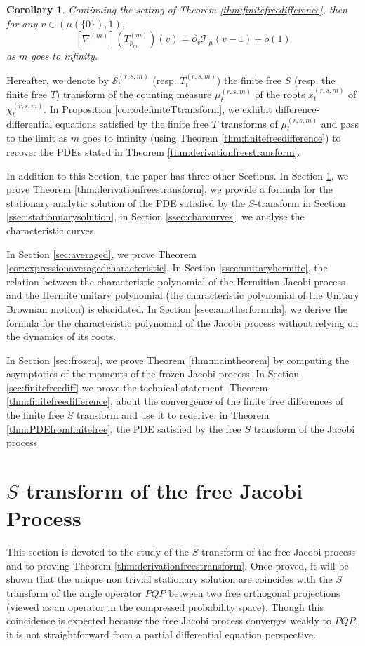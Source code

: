\documentclass[12pt,reqno]{amsart}
\newtheorem{corollary}{Corollary}
\begin{document}
\begin{corollary}
Continuing the setting of Theorem \ref{thm:finitefreedifference}, then for any $v \in (\mu{(\{ 0 \})},1)$, 
$$
[\nabla^{(m)}](T^{(m)}_{p_m})(v) = \partial_v \mathcal{T}_\mu(v-1) + o(1)
$$
as $m$ goes to infinity.
\end{corollary}
Hereafter, we denote by $\mathcal{S}^{(r,s,m)}_t$ (resp. $T^{(r,s,m)}_t$) the finite free $S$ (resp. the finite free $T$) transform of the counting measure $\mu^{(r,s,m)}_t$ of the roots 
$x^{(r,s,m)}_t$ of $\chi^{(r,s,m)}_t$. 
In Proposition \ref{cor:odefiniteTtransform}, we exhibit difference-differential equations satisfied by the finite free $T$ transforms of $\mu^{(r,s,m)}_t$ and pass to the limit as $m$ goes to infinity (using Theorem \ref{thm:finitefreedifference}) to recover the PDEs stated in Theorem \ref{thm:derivationfreestransform}.

In addition to this Section, the paper has three other Sections. In Section \ref{sec:stransformfree}, we prove Theorem \ref{thm:derivationfreestransform}, we provide a formula for the stationary analytic solution of the PDE satisfied by the $S$-transform in Section \ref{ssec:stationnarysolution},  in Section \ref{ssec:charcurves}, we analyse the characteristic curves. 

In Section \ref{sec:averaged}, we prove Theorem \ref{cor:expressionaveragedcharacteristic}. In Section \ref{ssec:unitaryhermite}, the relation between the characteristic polynomial of the Hermitian Jacobi process and the Hermite unitary polynomial (the characteristic polynomial of the Unitary Brownian motion) is elucidated. In Section \ref{ssec:anotherformula}, we derive the formula for the characteristic polynomial of the Jacobi process without relying on the dynamics of its roots. 

In Section \ref{sec:frozen}, we prove Theorem \ref{thm:maintheorem} by computing the asymptotics of the moments of the frozen Jacobi process. In Section \ref{sec:finitefreediff} we prove the technical statement, Theorem \ref{thm:finitefreedifference}, about the convergence of the finite free differences of the finite free $S$ transform and use it to rederive, in Theorem \ref{thm:PDEfromfinitefree}, the PDE satisfied by the free $S$ transform of the Jacobi process

\section{\texorpdfstring{$S$}{S} transform of the free Jacobi Process}
\label{sec:stransformfree}
This section is devoted to the study of the $S$-transform of the free Jacobi process and to proving Theorem \ref{thm:derivationfreestransform}. Once proved, it will be shown that the unique non trivial stationary solution are coincides with the $S$ transform of the angle operator $PQP$ between two free orthogonal projections (viewed as an operator in the compressed probability space). Though this coincidence is expected because the free Jacobi process converges weakly to $PQP$, it is not straightforward from a partial differential equation perspective. 
\end{document}
